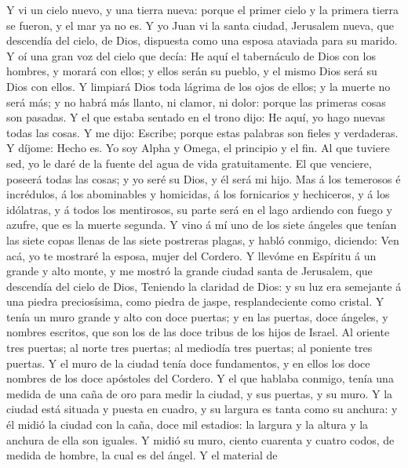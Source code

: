  Y vi un cielo nuevo, y una tierra nueva: porque el primer
cielo y la primera tierra se fueron, y el mar ya no es.  Y
yo Juan vi la santa ciudad, Jerusalem nueva, que descendía del cielo, de
Dios, dispuesta como una esposa ataviada para su marido. 
Y oí una gran voz del cielo que decía: He aquí el tabernáculo de Dios
con los hombres, y morará con ellos; y ellos serán su pueblo, y el mismo
Dios será su Dios con ellos.  Y limpiará Dios toda lágrima
de los ojos de ellos; y la muerte no será más; y no habrá más llanto, ni
clamor, ni dolor: porque las primeras cosas son pasadas. 
Y el que estaba sentado en el trono dijo: He aquí, yo hago nuevas todas
las cosas. Y me dijo: Escribe; porque estas palabras son fieles y
verdaderas.  Y díjome: Hecho es. Yo soy Alpha y Omega, el
principio y el fin. Al que tuviere sed, yo le daré de la fuente del agua
de vida gratuitamente.  El que venciere, poseerá todas las
cosas; y yo seré su Dios, y él será mi hijo.  Mas á los
temerosos é incrédulos, á los abominables y homicidas, á los fornicarios
y hechiceros, y á los idólatras, y á todos los mentirosos, su parte será
en el lago ardiendo con fuego y azufre, que es la muerte segunda.
 Y vino á mí uno de los siete ángeles que tenían las siete
copas llenas de las siete postreras plagas, y habló conmigo, diciendo:
Ven acá, yo te mostraré la esposa, mujer del Cordero.  Y
llevóme en Espíritu á un grande y alto monte, y me mostró la grande
ciudad santa de Jerusalem, que descendía del cielo de Dios,
 Teniendo la claridad de Dios: y su luz era semejante á
una piedra preciosísima, como piedra de jaspe, resplandeciente como
cristal.  Y tenía un muro grande y alto con doce puertas;
y en las puertas, doce ángeles, y nombres escritos, que son los de las
doce tribus de los hijos de Israel.  Al oriente tres
puertas; al norte tres puertas; al mediodía tres puertas; al poniente
tres puertas.  Y el muro de la ciudad tenía doce
fundamentos, y en ellos los doce nombres de los doce apóstoles del
Cordero.  Y el que hablaba conmigo, tenía una medida de
una caña de oro para medir la ciudad, y sus puertas, y su muro.
 Y la ciudad está situada y puesta en cuadro, y su
largura es tanta como su anchura: y él midió la ciudad con la caña, doce
mil estadios: la largura y la altura y la anchura de ella son iguales.
 Y midió su muro, ciento cuarenta y cuatro codos, de
medida de hombre, la cual es del ángel.  Y el material de
